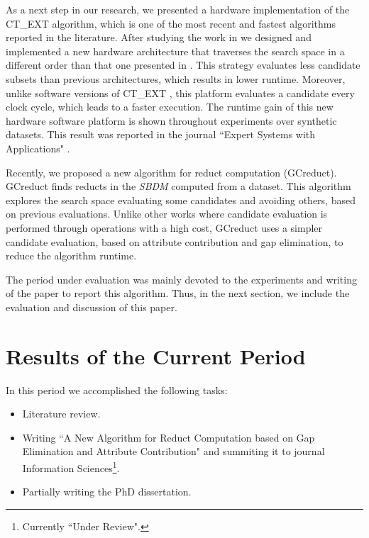\documentclass[authoryear,11pt]{elsarticle}
\begin{document}
  As a next step in our research, we presented a hardware implementation of the CT\_EXT algorithm, which is one of the most recent and fastest algorithms reported in the literature. After studying the work in \citep{Rojas12} we designed and implemented a new hardware architecture that traverses the search space in a different order than that one presented in \citep{Rojas07, Rojas12,Rodriguez14}. This strategy evaluates less	candidate subsets than previous architectures, which results in lower runtime. Moreover, unlike software versions of CT\_EXT \citep{Sanchez07, Sanchez10}, this platform evaluates a candidate every clock cycle, which leads to a faster execution. The runtime gain of this new hardware software platform is shown throughout experiments over synthetic datasets. This result was reported in the journal ``Expert Systems with Applications"  \citep{Rodriguez15}.
  
  Recently, we proposed a new algorithm for reduct computation (GCreduct). GCreduct finds reducts in the \textit{SBDM} computed from a dataset. This algorithm explores the search space evaluating some candidates and avoiding others, based on previous evaluations. Unlike other works \citep{WangP07,Lias13} where candidate evaluation is performed through operations with a high cost, GCreduct uses a simpler candidate evaluation, based on attribute contribution and gap elimination, to reduce the algorithm runtime. 
  
  The period under evaluation was mainly devoted to the experiments and writing of the paper to report this algorithm. Thus, in the next section, we include the evaluation and discussion of this paper.


\section{Results of the Current Period}\label{current_results}
  In this period we accomplished the following tasks:
  \begin{itemize}
  	\itemsep0em 
  	\item Literature review.
  	\item Writing ``A New Algorithm for Reduct Computation based on Gap Elimination and Attribute Contribution" and summiting it to journal Information Sciences\footnote{Currently ``Under Review".}.
  	\item Partially writing the PhD dissertation.
  \end{itemize}
  
\end{document}
